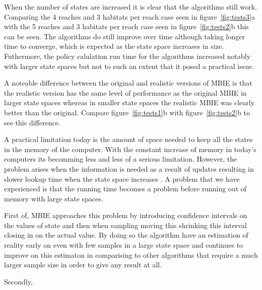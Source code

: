 When the number of states are increased it is clear that the algorithms still
work. Comparing the 4 reaches and 3 habitats per reach case seen in
figure~\ref{fig:tests3}a with the 5 reaches and 3 habitats per reach case seen
in figure~\ref{fig:tests2}b this can be seen. The algorithms do still improve
over time although taking longer time to converge, which is expected as the
state space increases in size. Futhermore, the policy calulation run time for
the algorithms increased notably with larger state spaces but not to such an
extent that it posed a practical issue.

A noteable difference between the original and realistic versions of MBIE is
that the realistic version has the same level of performance as the original
MBIE in larger state spaces whereas in smaller state spaces the realistic MBIE
was clearly better than the original. Compare figure~\ref{fig:tests1}b with
figure~\ref{fig:tests2}b to see this difference. 

A practical limitation today is the amount of space needed to keep all the
states in the memory of the computer. With the constant increase of memory in
today's computers its becomming less and less of a serious limitation. However,
the problem arises when the information is needed as a result of updates
resulting in slower lookup time when the state space increases
\parencite{szepesvari2010algorithms}. A problem that we have experienced is
that the running time becomes a problem before running out of memory with large
state spaces. 

First of, MBIE approaches this problem by introducing confidence intervals on
the values of state and then when sampling moving this shrinking this interval
closing in on the actual value. By doing so the algorithm have an estimation of
reality early on even with few samples in a large state space and continues to
improve on this estimaton in comparising to other algorithms
 that require a much larger sample size in order
to give any result at all. 

Secondly, 
